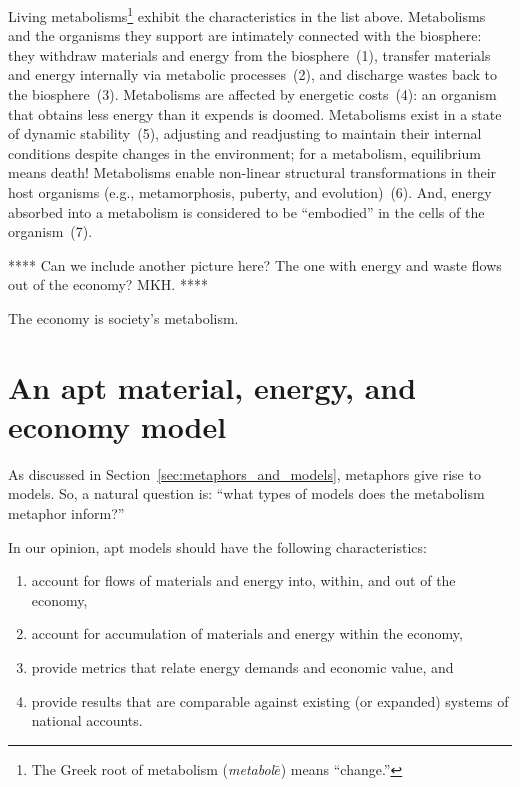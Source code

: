 Living metabolisms\footnote{The 
	Greek root of metabolism 
	(\emph{metabol$\bar{e}$}) means ``change.''}
exhibit the characteristics in the list above.
Metabolisms and the organisms they support
are intimately connected with the biosphere:
they withdraw materials and energy from the biosphere~(1), 
transfer materials and energy internally via metabolic processes~(2), 
and discharge wastes back to the biosphere~(3).
Metabolisms are affected by energetic costs~(4): 
an organism that obtains less energy than it expends is doomed.
Metabolisms exist in a state of dynamic stability~(5),
adjusting and readjusting to maintain their internal conditions
despite changes in the environment; 
for a metabolism, equilibrium means death!
Metabolisms enable non-linear structural transformations
in their host organisms (e.g., metamorphosis, puberty, and evolution)~(6).
And, energy absorbed into a metabolism is considered to be ``embodied''
in the cells of the organism~(7).

**** Can we include another picture here? 
The one with energy and waste flows out of the economy? MKH.
****

The economy is society's metabolism.\cite{F-K1998, Giampietro2000, Giampietro2013}


\section{An apt material, energy, and economy model}
\label{sec:apt_models}

As discussed in Section~\ref{sec:metaphors_and_models}, 
metaphors give rise to models.
So, a natural question is: 
``what types of models does the metabolism metaphor inform?''

In our opinion, apt models should have the following characteristics:

\begin{enumerate}
	\item{account for flows of materials and energy into, within, and out of the economy,}
	\item{account for accumulation of materials and energy within the economy,}
	\item{provide metrics that relate energy demands and economic value, and}
	\item{provide results that are comparable against existing 
			(or expanded) systems of national accounts.}
\end{enumerate}

